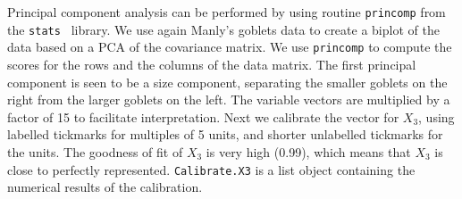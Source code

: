 \documentclass[a4paper]{article}
\begin{document}
Principal component analysis can be performed by using routine {\tt princomp} from the {\tt stats }
library. We use again Manly's goblets data to create a biplot of the data based on a
PCA of the covariance matrix. We use {\tt princomp} to compute the scores for the rows and the columns
of the data matrix. The first principal component is seen to be a size component, separating the
smaller goblets on the right from the larger goblets on the left. The variable vectors are 
multiplied by a factor of 15 to facilitate interpretation. Next  we 
calibrate the vector for $X_3$, 
using labelled tickmarks for multiples of 5 units, and shorter unlabelled tickmarks for the units. The 
goodness of fit of $X_3$ is very high (0.99), which means that $X_3$ is close to perfectly 
represented. {\tt Calibrate.X3} is a list object containing the numerical results of the 
calibration.
\end{document}
